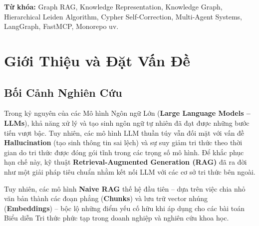 \documentclass[11pt,a4paper]{report}
\begin{document}
\textbf{Từ khóa:} Graph RAG, Knowledge Representation, Knowledge Graph, Hierarchical Leiden Algorithm, Cypher Self-Correction, Multi-Agent Systems, LangGraph, FastMCP, Monorepo uv.

\newpage
\tableofcontents
\newpage
\listoffigures
\listoftables
\newpage

\setcounter{page}{1}

\chapter{Giới Thiệu và Đặt Vấn Đề}

\section{Bối Cảnh Nghiên Cứu}
Trong kỷ nguyên của các Mô hình Ngôn ngữ Lớn (\textbf{Large Language Models -- LLMs}), khả năng xử lý và tạo sinh ngôn ngữ tự nhiên đã đạt được những bước tiến vượt bậc. Tuy nhiên, các mô hình LLM thuần túy vẫn đối mặt với vấn đề \textbf{Hallucination} (tạo sinh thông tin sai lệch) và sự suy giảm tri thức theo thời gian do tri thức được đóng gói tĩnh trong các trọng số mô hình. Để khắc phục hạn chế này, kỹ thuật \textbf{Retrieval-Augmented Generation (RAG)} đã ra đời như một giải pháp tiêu chuẩn nhằm kết nối LLM với các cơ sở tri thức bên ngoài.

Tuy nhiên, các mô hình \textbf{Naive RAG} thế hệ đầu tiên -- dựa trên việc chia nhỏ văn bản thành các đoạn phẳng (\textbf{Chunks}) và lưu trữ vector nhúng (\textbf{Embeddings}) -- bộc lộ những điểm yếu cố hữu khi áp dụng cho các bài toán Biểu diễn Tri thức phức tạp trong doanh nghiệp và nghiên cứu khoa học.
\end{document}
